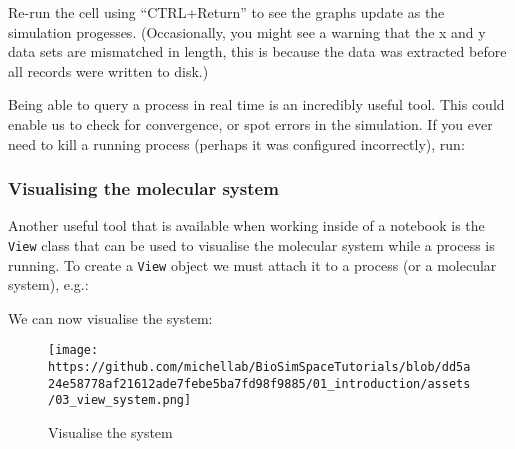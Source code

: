 Re-run the cell using ``CTRL+Return'' to see the graphs update as the
simulation progesses. (Occasionally, you might see a warning that the x
and y data sets are mismatched in length, this is because the data was
extracted before all records were written to disk.)

Being able to query a process in real time is an incredibly useful tool.
This could enable us to check for convergence, or spot errors in the
simulation. If you ever need to kill a running process (perhaps it was
configured incorrectly), run:

\begin{Shaded}
\begin{Highlighting}[]
\end{Highlighting}
\end{Shaded}

\hypertarget{visualising-the-molecular-system}{%
\subsubsection{Visualising the molecular
system}\label{visualising-the-molecular-system}}

Another useful tool that is available when working inside of a notebook
is the \texttt{View} class that can be used to visualise the molecular
system while a process is running. To create a \texttt{View} object we
must attach it to a process (or a molecular system), e.g.:

\begin{Shaded}
\begin{Highlighting}[]
\OperatorTok{=}
\end{Highlighting}
\end{Shaded}

We can now visualise the system:

\begin{Shaded}
\begin{Highlighting}[]
\end{Highlighting}
\end{Shaded}

\begin{figure}
\centering
\texttt{[image: https://github.com/michellab/BioSimSpaceTutorials/blob/dd5a24e58778af21612ade7febe5ba7fd98f9885/01\_introduction/assets/03\_view\_system.png]}
\caption{Visualise the system}
\end{figure}

